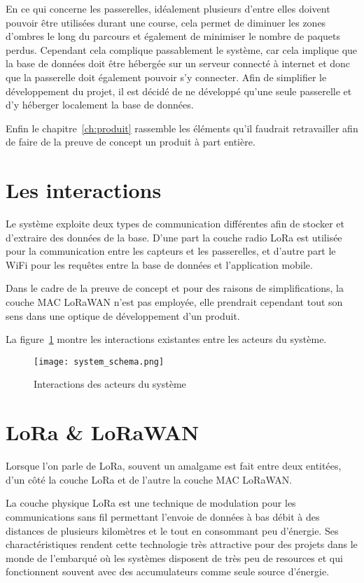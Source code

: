 En ce qui concerne les passerelles, idéalement plusieurs d'entre elles doivent pouvoir être utilisées durant une course, cela permet de diminuer les zones d'ombres le long du parcours et également de minimiser le nombre de paquets perdus. Cependant cela complique passablement le système, car cela implique que la base de données doit être hébergée sur un serveur connecté à internet et donc que la passerelle doit également pouvoir s'y connecter. Afin de simplifier le développement du projet, il est décidé de ne développé qu'une seule passerelle et d'y héberger localement la base de données.

Enfin le chapitre~\ref{ch:produit} rassemble les éléments qu'il faudrait retravailler afin de faire de la preuve de concept un produit à part entière.

\section{Les interactions}

Le système exploite deux types de communication différentes afin de stocker et d'extraire des données de la base. D'une part la couche radio LoRa est utilisée pour la communication entre les capteurs et les passerelles, et d'autre part le WiFi pour les requêtes entre la base de données et l'application mobile. 

Dans le cadre de la preuve de concept et pour des raisons de simplifications, la couche MAC LoRaWAN n'est pas employée, elle prendrait cependant tout son sens dans une optique de développement d'un produit.

La figure~\ref{fig:system_schema} montre les interactions existantes entre les acteurs du système.

\begin{figure}[htb]
\centering 
\texttt{[image: system\_schema.png]} 
\caption{Interactions des acteurs du système}
\label{fig:system_schema}
\end{figure}

\section{LoRa \& LoRaWAN}

Lorsque l'on parle de LoRa, souvent un amalgame est fait entre deux entitées, d'un côté la couche LoRa et de l'autre la couche MAC LoRaWAN.

La couche physique LoRa est une technique de modulation pour les communications sans fil permettant l'envoie de données à bas débit à des distances de plusieurs kilomètres et le tout en consommant peu d'énergie. Ses charactéristiques rendent cette technologie très attractive pour des projets dans le monde de l'embarqué où les systèmes disposent de très peu de resources et qui fonctionnent souvent avec des accumulateurs comme seule source d'énergie.

